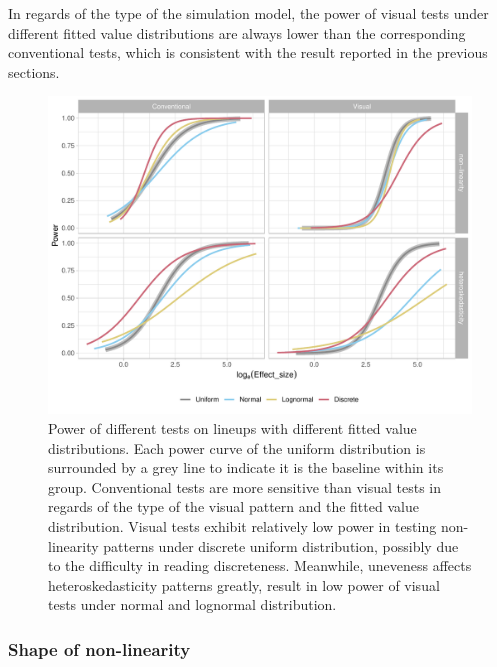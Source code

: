 \documentclass[]{interact}
\theoremstyle{plain}%
\theoremstyle{definition}
\theoremstyle{remark}
\begin{document}
In regards of the type of the simulation model, the power of visual
tests under different fitted value distributions are always lower than
the corresponding conventional tests, which is consistent with the
result reported in the previous sections.

\begin{figure}

{\centering \includegraphics[width=1\linewidth]{paper_comparison_files/figure-latex/different-x-dist-poly-power-1} 

}

\caption{Power of different tests on lineups with different fitted value distributions. Each power curve of the uniform distribution is surrounded by a grey line to indicate it is the baseline within its group. Conventional tests are more sensitive than visual tests in regards of the type of the visual pattern and the fitted value distribution. Visual tests exhibit relatively low power in testing non-linearity patterns under discrete uniform distribution, possibly due to the difficulty in reading discreteness. Meanwhile, uneveness affects heteroskedasticity patterns greatly, result in low power of visual tests under normal and lognormal distribution.}\label{fig:different-x-dist-poly-power}
\end{figure}

\hypertarget{shape-of-non-linearity}{%
\subsubsection{Shape of non-linearity}\label{shape-of-non-linearity}}
\end{document}
